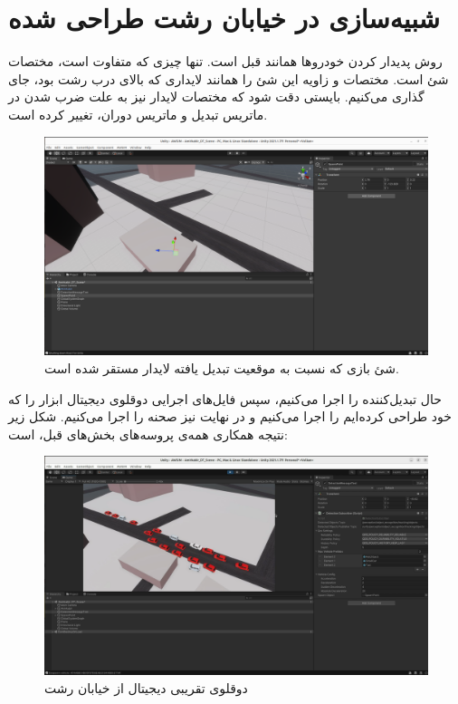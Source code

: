 \section{شبیه‌سازی در خیابان رشت طراحی شده}
 روش پدیدار کردن خودروها همانند قبل است. تنها چیزی که متفاوت است،‌ مختصات شئ  است. مختصات و زاویه این شئ را همانند لایداری که بالای درب رشت بود، جای گذاری می‌کنیم. بایستی دقت شود که مختصات لایدار نیز به علت ضرب شدن در ماتریس تبدیل و ماتریس دوران، تغییر کرده است.
 \begin{figure}
     \centering
     \includegraphics[width=1\linewidth]{figures/Amirkabir_DT_SpawnPoint.png}
     \caption{شئ بازی  که نسبت به موقعیت تبدیل یافته لایدار مستقر شده است.}
     \label{fig:Amirkabir_DT_SpawnPoint}
 \end{figure}
 حال تبدیل‌کننده را اجرا می‌کنیم، سپس فایل‌های اجرایی دوقلوی دیجیتال ابزار  را که خود طراحی کرده‌ایم را اجرا می‌کنیم و در نهایت نیز صحنه  را اجرا می‌کنیم. شکل زیر نتیجه همکاری همه‌ی پروسه‌های بخش‌های قبل، است:

 \begin{figure}[h!]
     \centering
     \includegraphics[width=1\linewidth]{figures/Amirkabir_Traffic_Simulation.png}
     \caption{دوقلوی تقریبی دیجیتال از خیابان رشت}
     \label{fig:Amirkabir_Traffic_Simulation}
 \end{figure}

